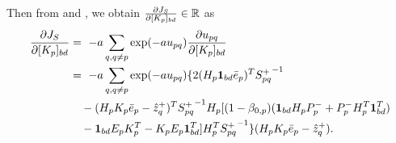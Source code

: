 \begin{appendix}
Then from  and , we obtain $\frac{\partial J_S}{\partial [K_p]_{bd}}\in\mathbb{R}$ as
\begin{align}
\label{eqn:JSK}
\frac{\partial J_S}{\partial [K_p]_{bd}}&=\ -a\sum\limits_{q,q\neq p}\exp (-au_{pq})\frac{\partial u_{pq}}{\partial [K_p]_{bd}}
\nonumber
\\
&=\ -a\sum\limits_{q,q\neq p}\exp (-au_{pq})
\{
2(H_p\mathbf{1}_{bd}{\bar{e}}_p)^T
{S_{pq}^+}^{-1}
\nonumber
\\
& \quad
-(H_pK_p{\bar{e}}_p-\hat z^+_{q})^T
{S^+_{pq}}^{-1}
H_p
[(1-\beta_{0,p})(\mathbf{1}_{bd} H_pP_p^-
+P_p^-H_p^T\mathbf{1}_{bd}^T)
\nonumber
\\
& \quad
-\mathbf{1}_{bd} E_pK_p^T
-K_pE_p\mathbf{1}_{bd}^T]
H_p^T
{S^+_{pq}}^{-1}
\}(H_pK_p{\bar{e}}_p-\hat z^+_{q}).
\end{align}




\end{appendix}
